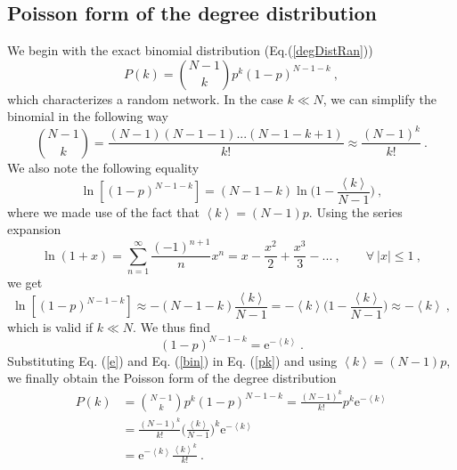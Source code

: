 \documentclass[11 pt , letterpaper , twoside , openright]{book}
\begin{document}
\subsection{Poisson form of the degree distribution}\label{poiss}
We begin with the exact binomial distribution (Eq.(\ref{degDistRan}))
\begin{equation}\label{pk}
	P(k) = \binom{N-1}{k}p^k (1-p)^{N-1-k} \ ,
\end{equation}
which characterizes a random network. In the case $k \ll N$, we can simplify the binomial in the following way \cite{Albert2014}
\begin{equation}\label{bin}
	\binom{N-1}{k} = \frac{(N-1)(N-1-1)...(N-1-k+1)}{k!} \approx \frac{(N-1)^k}{k!} \ .
\end{equation}
We also note the following equality \cite{Albert2014}
\begin{equation}
	\ln[(1-p)^{N-1-k}] = (N-1-k)\ln\bigg(1 - \frac{\left<k\right>}{N-1} \bigg) \ ,
\end{equation}
where we made use of the fact that $\left<k\right> = (N-1)p$. Using the series expansion \cite{Albert2014}
\begin{equation}
	\ln(1+x) = \sum_{n=1}^{\infty}\frac{(-1)^{n+1}}{n}x^n = x - \frac{x^2}{2} + \frac{x^3}{3} - ... \ ,  \qquad \forall \ |x| \leqslant 1 \ ,
\end{equation}
we get \cite{Albert2014}
\begin{equation}
	\ln[(1-p)^{N-1-k}] \approx -(N-1-k) \frac{\left<k\right>}{N-1} = - \left<k\right>\bigg(1 - \frac{\left<k\right>}{N-1} \bigg) \approx - \left<k\right> \ ,
\end{equation}
which is valid if $k \ll N$. We thus find \cite{Albert2014}
\begin{equation}\label{e}
	(1-p)^{N-1-k} = \mathrm{e}^{-\left<k\right>} \ .
\end{equation}
Substituting Eq. (\ref{e}) and Eq. (\ref{bin}) in Eq. (\ref{pk}) and using $\left<k\right> = (N-1)p$, we finally obtain the Poisson form of the degree distribution \cite{Albert2014}
\begin{equation}
\begin{split}
	P(k) &= \binom{N-1}{k}p^k (1-p)^{N-1-k} = \frac{(N-1)^k}{k!} p^k \mathrm{e}^{-\left<k\right>} \\
&= \frac{(N-1)^k}{k!} \bigg(\frac{\left<k\right>}{N-1} \bigg)^k \mathrm{e}^{-\left<k\right>}\\
&= \mathrm{e}^{-\left<k\right>}\frac{\left<k\right>^k}{k!} \ .
\end{split}
\end{equation}
\end{document}
